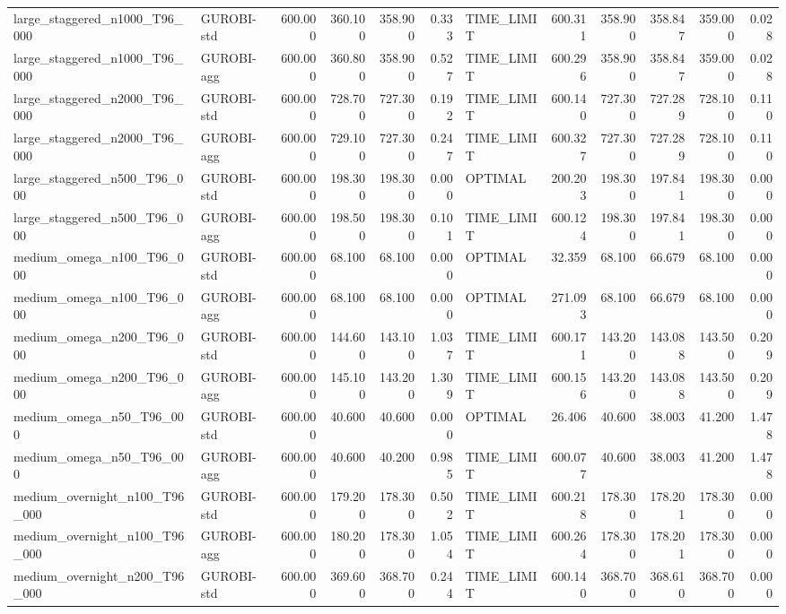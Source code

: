 \begin{table}[htbp]
\begin{tabular}{llrrrrlrrrrr}
large\_staggered\_n1000\_T96\_000 & GUROBI-std & 600.000 & 360.100 & 358.900 & 0.333 & TIME\_LIMIT & 600.311 & 358.900 & 358.847 & 359.000 & 0.028 \\
large\_staggered\_n1000\_T96\_000 & GUROBI-agg & 600.000 & 360.800 & 358.900 & 0.527 & TIME\_LIMIT & 600.296 & 358.900 & 358.847 & 359.000 & 0.028 \\
large\_staggered\_n2000\_T96\_000 & GUROBI-std & 600.000 & 728.700 & 727.300 & 0.192 & TIME\_LIMIT & 600.140 & 727.300 & 727.289 & 728.100 & 0.110 \\
large\_staggered\_n2000\_T96\_000 & GUROBI-agg & 600.000 & 729.100 & 727.300 & 0.247 & TIME\_LIMIT & 600.327 & 727.300 & 727.289 & 728.100 & 0.110 \\
large\_staggered\_n500\_T96\_000 & GUROBI-std & 600.000 & 198.300 & 198.300 & 0.000 & OPTIMAL & 200.203 & 198.300 & 197.841 & 198.300 & 0.000 \\
large\_staggered\_n500\_T96\_000 & GUROBI-agg & 600.000 & 198.500 & 198.300 & 0.101 & TIME\_LIMIT & 600.124 & 198.300 & 197.841 & 198.300 & 0.000 \\
medium\_omega\_n100\_T96\_000 & GUROBI-std & 600.000 & 68.100 & 68.100 & 0.000 & OPTIMAL & 32.359 & 68.100 & 66.679 & 68.100 & 0.000 \\
medium\_omega\_n100\_T96\_000 & GUROBI-agg & 600.000 & 68.100 & 68.100 & 0.000 & OPTIMAL & 271.093 & 68.100 & 66.679 & 68.100 & 0.000 \\
medium\_omega\_n200\_T96\_000 & GUROBI-std & 600.000 & 144.600 & 143.100 & 1.037 & TIME\_LIMIT & 600.171 & 143.200 & 143.088 & 143.500 & 0.209 \\
medium\_omega\_n200\_T96\_000 & GUROBI-agg & 600.000 & 145.100 & 143.200 & 1.309 & TIME\_LIMIT & 600.156 & 143.200 & 143.088 & 143.500 & 0.209 \\
medium\_omega\_n50\_T96\_000 & GUROBI-std & 600.000 & 40.600 & 40.600 & 0.000 & OPTIMAL & 26.406 & 40.600 & 38.003 & 41.200 & 1.478 \\
medium\_omega\_n50\_T96\_000 & GUROBI-agg & 600.000 & 40.600 & 40.200 & 0.985 & TIME\_LIMIT & 600.077 & 40.600 & 38.003 & 41.200 & 1.478 \\
medium\_overnight\_n100\_T96\_000 & GUROBI-std & 600.000 & 179.200 & 178.300 & 0.502 & TIME\_LIMIT & 600.218 & 178.300 & 178.201 & 178.300 & 0.000 \\
medium\_overnight\_n100\_T96\_000 & GUROBI-agg & 600.000 & 180.200 & 178.300 & 1.054 & TIME\_LIMIT & 600.264 & 178.300 & 178.201 & 178.300 & 0.000 \\
medium\_overnight\_n200\_T96\_000 & GUROBI-std & 600.000 & 369.600 & 368.700 & 0.244 & TIME\_LIMIT & 600.140 & 368.700 & 368.610 & 368.700 & 0.000 \\

\end{tabular}
\end{table}

